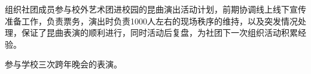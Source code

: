 \vspace{-4.0mm}

\begin{cventries}
\cvpapers
{
    \begin{cvitems}
    \item {组织社团成员参与校外艺术团进校园的昆曲演出活动计划，前期协调线上线下宣传准备工作，负责票务，演出时负责1000人左右的现场秩序的维持，以及突发情况处理，保证了昆曲表演的顺利进行，同时活动后复盘，为社团下一次组织活动积累经验。}
    \item {参与学校三次跨年晚会的表演。}
    \end{cvitems}
}
\end{cventries}